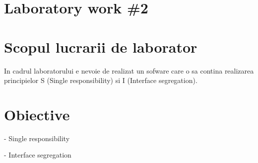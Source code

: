 \section*{Laboratory work \#2}

\section{Scopul lucrarii de laborator}

In cadrul laboratorului e nevoie de realizat un sofware care o sa contina realizarea
principielor S (Single responsibility) si I (Interface segregation).

\section{Obiective}

 - Single responsibility
  
 - Interface segregation

\clearpage